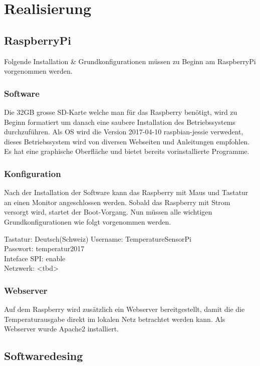 \section{Realisierung}

\subsection{RaspberryPi}

Folgende Installation \& Grundkonfigurationen müssen zu Beginn am RaspberryPi vorgenommen werden.

\subsubsection{Software}
Die 32GB grosse SD-Karte welche man für das Raspberry benötigt, wird zu Beginn formatiert um danach eine saubere Installation des Betriebssystems durchzuführen. Als OS wird die Version 2017-04-10 raspbian-jessie verwedent, dieses Betriebssystem wird von diversen Webseiten und Anleitungen empfohlen. Es hat eine graphische Oberfläche und bietet bereits vorinstallierte Programme.


\subsubsection{Konfiguration}
Nach der Installation der Software kann das Raspberry mit Maus und Tastatur an einen Monitor angeschlossen werden. Sobald das Raspberry mit Strom versorgt wird, startet der Boot-Vorgang.
Nun müssen alle wichtigen Grundkonfigurationen wie folgt vorgenommen werden.

Tastatur: Deutsch(Schweiz)
Username: TemperatureSensorPi\\
Passwort: temperatur2017\\
Inteface SPI: enable\\
Netzwerk: <tbd>

\subsubsection{Webserver}
Auf dem Raspberry wird zusätzlich ein Webserver bereitgestellt, damit die die Temperaturausgabe direkt im lokalen Netz betrachtet werden kann. Als Webserver wurde Apache2 installiert.


\subsection{Softwaredesing}

